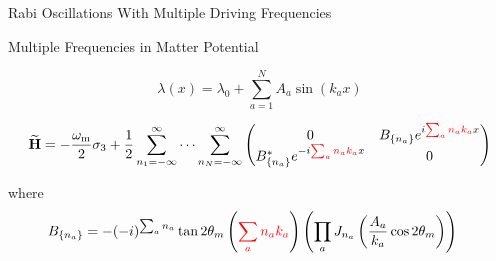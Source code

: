 \begin{frame}{Rabi Oscillations With Multiple Driving Frequencies}

\end{frame}

\begin{frame}{Multiple Frequencies in Matter Potential}




\begin{equation*}
\lambda(x) = \lambda_0 + \sum_{a=1}^N A_a \sin(k_a x )
\end{equation*}


\begin{tcolorbox}[title=Hamiltonian in Rabi Basis]


\begin{equation*}
\mathbf{\widetilde H}= -\frac{\omega_{\mathrm m}}{2}\sigma_3 + \frac{1}{2} \sum_{n_1=-\infty}^\infty \cdots \sum_{n_N=-\infty}^\infty \begin{pmatrix}
0 &  B_{\{n_a\}} e^{i  {\color{red} \sum_a n_a k_a } x}\\
  B_{\{n_a\}}^* e^{ -i  {\color{red} \sum_a n_a k_a } x} & 0
\end{pmatrix}
\end{equation*}


where
\begin{align*}
    B_{\{n_a\}} &= -(-i)^{\sum_a n_a} \tan 2\theta_m \left( {\color{red}\sum_a n_a k_a} \right) \left( \prod_a J_{n_a}\left( \frac{A_a}{k_a}\cos 2\theta_m \right) \right)
\end{align*}




\end{tcolorbox}




\end{frame}




